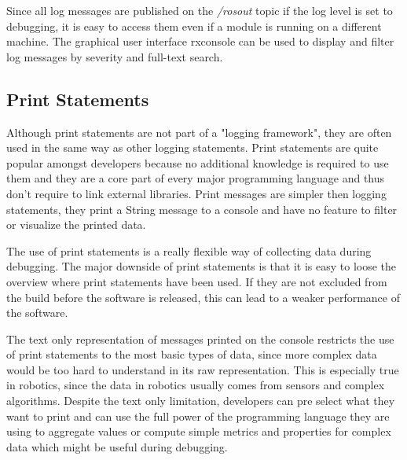 Since all log messages are published on the \emph{/rosout} topic if the log level is set to debugging, it is easy to access them even if a module is running on a different machine. The graphical user interface rxconsole can be used to display and filter log messages by severity and full-text search.

\subsection{Print Statements}
Although print statements are not part of a "logging framework", they are often used in the same way as other logging statements. Print statements are quite popular amongst developers because no additional knowledge is required to use them and they are a core part of every major programming language and thus don't require to link external libraries. Print messages are simpler then logging statements, they print a String message to a console and have no feature to filter or visualize the printed data.

The use of print statements is a really flexible way of collecting data during debugging. The major downside of print statements is that it is easy to loose the overview where print statements have been used. If they are not excluded from the build before the software is released, this can lead to a weaker performance of the software.

The text only representation of messages printed on the console restricts the use of print statements to the most basic types of data, since more complex data would be too hard to understand in its raw representation. This is especially true in robotics, since the data in robotics usually comes from sensors and complex algorithms. Despite the text only limitation, developers can pre select what they want to print and can use the full power of the programming language they are using to aggregate values or compute simple metrics and properties for complex data which might be useful during debugging.



